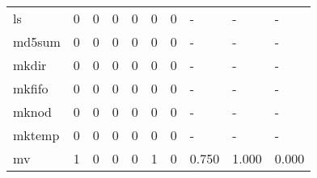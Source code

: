 \begin{longtable}{lp{2.0cm}p{2.0cm}p{2.0cm}p{2.0cm}p{2.0cm}p{2.0cm}p{2.0cm}p{2.0cm}p{2.0cm}}
ls        &                      0 &                                             0 &                                            0 &                                           0 &                                            0 &                                          0 &                                    - &                                      - &                                    - \\
md5sum    &                      0 &                                             0 &                                            0 &                                           0 &                                            0 &                                          0 &                                    - &                                      - &                                    - \\
mkdir     &                      0 &                                             0 &                                            0 &                                           0 &                                            0 &                                          0 &                                    - &                                      - &                                    - \\
mkfifo    &                      0 &                                             0 &                                            0 &                                           0 &                                            0 &                                          0 &                                    - &                                      - &                                    - \\
mknod     &                      0 &                                             0 &                                            0 &                                           0 &                                            0 &                                          0 &                                    - &                                      - &                                    - \\
mktemp    &                      0 &                                             0 &                                            0 &                                           0 &                                            0 &                                          0 &                                    - &                                      - &                                    - \\
mv        &                      1 &                                             0 &                                            0 &                                           0 &                                            1 &                                          0 &                                0.750 &                                  1.000 &                                0.000 \\

\end{longtable}
